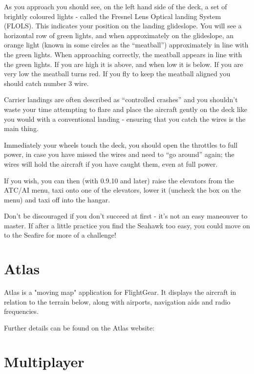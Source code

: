 As you approach you should see, on the left hand side of the deck, a set of brightly coloured lights - called 
the Fresnel Lens Optical landing System (FLOLS). This indicates your position on the landing glideslope. 
You will see a horizontal row of green lights, and when approximately on the glideslope, an orange light 
(known in some circles as the ``meatball'') approximately in line with the green lights. When approaching 
correctly, the meatball appears in line with the green lights. If you are high it is above, and when low 
it is below. If you are very low the meatball turns red. If you fly to keep the meatball aligned you 
should catch number 3 wire.

Carrier landings are often described as ``controlled crashes'' and you shouldn't waste your time attempting 
to flare and place the aircraft gently on the deck like you would with a conventional landing - ensuring that 
you catch the wires is the main thing.

Immediately your wheels touch the deck, you should open the throttles to full power, in case you have 
missed the wires and need to ``go around'' again; the wires will hold the aircraft if you have caught them, 
even at full power.

If you wish, you can then (with 0.9.10 and later) raise the elevators from the ATC/AI menu, taxi onto one of the elevators, 
lower it (uncheck the box on the menu) and taxi off into the hangar.

Don't be discouraged if you don't succeed at first - it's not an easy maneouver to master. If after a little 
practice you find the Seahawk too easy, you could move on to the Seafire for more of a challenge! 


\section{Atlas\label{Atlas}}

Atlas is a "moving map" application for FlightGear. It displays the aircraft in relation to the terrain below, 
along with airports, navigation aids and radio frequencies. 

Further details can be found on the Atlas website:

\noindent
{}

\section{Multiplayer}

